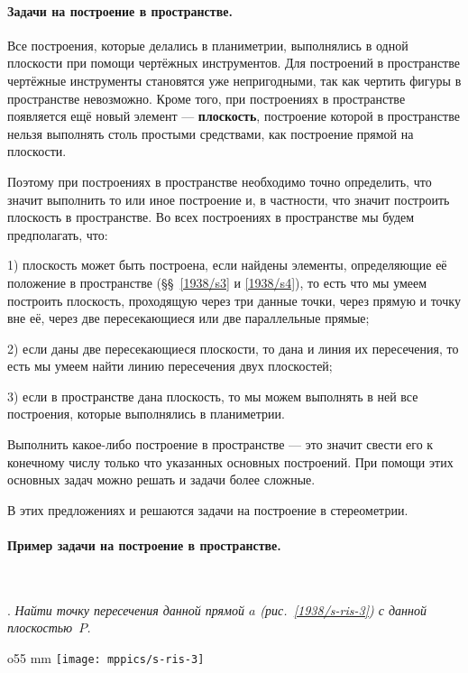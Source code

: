 \paragraph{Задачи на построение в пространстве.}\label{1938/s6}
Все построения, которые делались в планиметрии, выполнялись в одной плоскости при помощи чертёжных инструментов.
Для построений в пространстве чертёжные инструменты становятся уже непригодными, так как чертить фигуры в пространстве невозможно.
Кроме того, при построениях в пространстве появляется ещё новый элемент — \textbf{плоскость}, построение которой в пространстве нельзя выполнять столь простыми средствами, как построение прямой на плоскости.

Поэтому при построениях в пространстве необходимо точно {определить, что значит выполнить то или иное построение} и, в частности, что значит построить плоскость в пространстве.
Во всех построениях в пространстве мы будем предполагать, что:

1) плоскость может быть построена, если найдены элементы, определяющие её положение в пространстве (§§~\ref{1938/s3} и \ref{1938/s4}), то есть что мы умеем построить плоскость, проходящую через три данные точки, через прямую и точку вне её, через две пересекающиеся или две параллельные прямые;

2) если даны две пересекающиеся плоскости, то дана и линия их пересечения, то есть мы умеем найти линию пересечения двух плоскостей;

3) если в пространстве дана плоскость, то мы можем выполнять в ней все построения, которые выполнялись в планиметрии.

{Выполнить какое-либо построение в пространстве — это значит свести его к конечному числу только что указанных основных построений.}
При помощи этих основных задач можно решать и задачи более сложные.

В этих предложениях и решаются задачи на построение в стереометрии.

\paragraph{Пример задачи на построение в пространстве.}\label{1938/s7}\ 

.
\emph{Найти точку пересечения данной прямой $a$ \emph{(рис.~\ref{1938/s-ris-3})} с данной плоскостью~$P$.}

\begin{wrapfigure}{o}{55 mm}
\centering
\texttt{[image: mppics/s-ris-3]}
\caption{}\label{1938/s-ris-3}
\end{wrapfigure}

